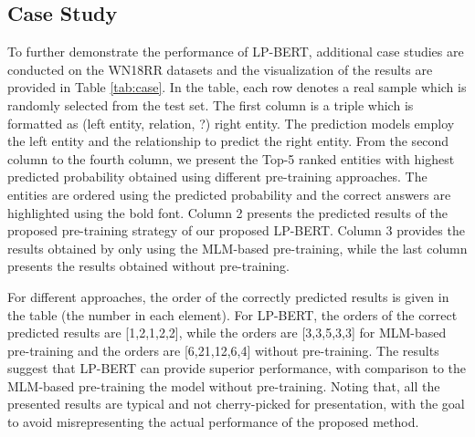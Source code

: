 \documentclass[journal]{IEEEtran}
\begin{document}
\subsection{Case Study}

To further demonstrate the performance of LP-BERT, additional case studies are conducted on the WN18RR datasets and the visualization of the results are provided in Table \ref{tab:case}. In the table, each row denotes a real sample which is randomly selected from the test set.
The first column is a triple which is formatted as (left entity, relation, ?)  right entity. The prediction models employ the left entity and the relationship to predict the right entity. From the second column to the fourth column, we present the Top-5 ranked entities with highest predicted probability obtained using different pre-training approaches. The entities are ordered using the predicted probability and the correct answers are highlighted using the bold font. Column 2 presents the predicted results of the proposed pre-training strategy of our proposed LP-BERT. Column 3 provides the results obtained by only using the MLM-based pre-training, while the last column presents the results obtained without pre-training. 

For different approaches, the order of the correctly predicted results is given in the table (the number in each element). For LP-BERT, the orders of the correct predicted results are [1,2,1,2,2], while the orders are [3,3,5,3,3] for MLM-based pre-training and the orders are [6,21,12,6,4] without pre-training. The results suggest that LP-BERT can provide superior performance, with comparison to the MLM-based pre-training the model without pre-training.
Noting that, all the presented results are typical and not cherry-picked for presentation, with the goal to avoid misrepresenting the actual performance of the proposed method.
\end{document}

